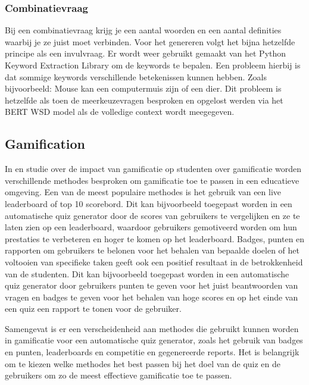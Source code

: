 \subsubsection{Combinatievraag}
\label{sec:combinatievraag}
Bij een combinatievraag krijg je een aantal woorden en een aantal definities waarbij je ze juist moet verbinden. Voor het genereren volgt het bijna hetzelfde principe als een invulvraag. Er wordt weer gebruikt gemaakt van het Python Keyword Extraction Library om de keywords te bepalen. Een probleem hierbij is dat sommige keywords verschillende betekenissen kunnen hebben. Zoals bijvoorbeeld: Mouse kan een computermuis zijn of een dier. Dit probleem is hetzelfde als toen de meerkeuzevragen besproken en opgelost werden via het BERT WSD model als de volledige context wordt meegegeven. 

\subsection{Gamification}
\label{sec:gamification}

In en studie over de impact van gamificatie op studenten over gamificatie worden verschillende methodes besproken om gamificatie toe te passen in een educatieve omgeving. Een van de meest populaire methodes is het gebruik van een live leaderboard of top 10 scorebord. Dit kan bijvoorbeeld toegepast worden in een automatische quiz generator door de scores van gebruikers te vergelijken en ze te laten zien op een leaderboard, waardoor gebruikers gemotiveerd worden om hun prestaties te verbeteren en hoger te komen op het leaderboard. Badges, punten en rapporten om gebruikers te belonen voor het behalen van bepaalde doelen of het voltooien van specifieke taken geeft ook een positief resultaat in de betrokkenheid van de studenten. Dit kan bijvoorbeeld toegepast worden in een automatische quiz generator door gebruikers punten te geven voor het juist beantwoorden van vragen en badges te geven voor het behalen van hoge scores en op het einde van een quiz een rapport te tonen voor de gebruiker.\autocite{Smiderle2020}

Samengevat is er een verscheidenheid aan methodes die gebruikt kunnen worden in gamificatie voor een automatische quiz generator, zoals het gebruik van badges en punten, leaderboards en competitie en gegenereerde reports. Het is belangrijk om te kiezen welke methodes het best passen bij het doel van de quiz en de gebruikers om zo de meest effectieve gamificatie toe te passen.


